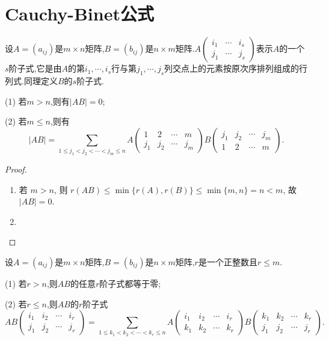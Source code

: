 \documentclass[../../main.tex]{subfiles}
\begin{document}
\section{Cauchy-Binet公式}

\begin{theorem}\label{theorem:Cauchy-Binet公式}
设\(A=(a_{ij})\)是\(m\times n\)矩阵,\(B=(b_{ij})\)是\(n\times m\)矩阵.\(A\left(\begin{matrix}
i_1 & \cdots & i_s\\
j_1 & \cdots & j_s
\end{matrix}\right)\)表示\(A\)的一个\(s\)阶子式,它是由\(A\)的第\(i_1,\cdots,i_s\)行与第\(j_1,\cdots,j_s\)列交点上的元素按原次序排列组成的行列式.同理定义\(B\)的\(s\)阶子式.

(1) 若\(m > n\),则有\(\vert AB\vert=0\);

(2) 若\(m\leqslant  n\),则有
\[\vert AB\vert=\sum_{1\leqslant  j_1<j_2<\cdots<j_m\leqslant  n}A\left(\begin{matrix}
1 & 2 & \cdots & m\\
j_1 & j_2 & \cdots & j_m
\end{matrix}\right)B\left(\begin{matrix}
j_1 & j_2 & \cdots & j_m\\
1 & 2 & \cdots & m
\end{matrix}\right).\]
\end{theorem}
\begin{proof}
\begin{enumerate}[(1)]
\item 若 \(m > n\), 则 \(r(AB) \leqslant  \min\{r(A), r(B)\} \leqslant  \min\{m, n\} = n < m\), 故 \(|AB| = 0\).

\item 
\end{enumerate}
\end{proof}

\begin{corollary}\label{corollary:Cauchy-Binet公式推论}
设\(A=(a_{ij})\)是\(m\times n\)矩阵,\(B=(b_{ij})\)是\(n\times m\)矩阵,\(r\)是一个正整数且\(r\leqslant  m\).

(1) 若\(r > n\),则\(AB\)的任意\(r\)阶子式都等于零;

(2) 若\(r\leqslant  n\),则\(AB\)的\(r\)阶子式
\[AB\left(\begin{matrix}
i_1 & i_2 & \cdots & i_r\\
j_1 & j_2 & \cdots & j_r
\end{matrix}\right)=\sum_{1\leqslant  k_1<k_2<\cdots<k_r\leqslant  n}A\left(\begin{matrix}
i_1 & i_2 & \cdots & i_r\\
k_1 & k_2 & \cdots & k_r
\end{matrix}\right)B\left(\begin{matrix}
k_1 & k_2 & \cdots & k_r\\
j_1 & j_2 & \cdots & j_r
\end{matrix}\right).\]
\end{corollary}
\end{document}
